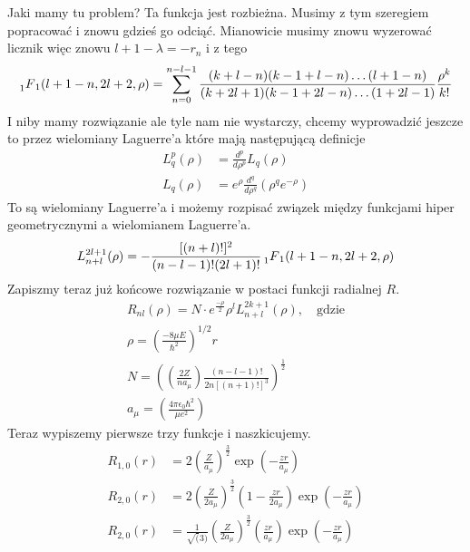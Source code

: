 Jaki mamy tu problem? Ta funkcja jest rozbieżna. Musimy z tym szeregiem popracować i znowu gdzieś go odciąć. Mianowicie musimy znowu wyzerować licznik więc znowu $l + 1 - \lambda = -r_n$ i z tego
\begin{equation*}
	\prescript{}{1}{F}_{1}(l + 1 - n, 2l+2, \rho) = \sum_{n=0}^{n - l -1} \frac{(k+l - n)(k -1+l-n)\dots(l+1-n)}{(k+2l+1)(k-1+2l - n)\dots(1 + 2l - 1)} \frac{\rho^k}{k!}
\end{equation*}
I niby mamy rozwiązanie ale tyle nam nie wystarczy, chcemy wyprowadzić jeszcze to przez wielomiany Laguerre'a które mają następującą definicje
\begin{equation*}
	\begin{split}
		L_q^p(\rho)&= \frac{d^p}{d \rho^p}L_q(\rho) \\
		L_q(\rho) &= e^{\rho} \frac{d^q}{d \rho^q}\left(\rho^q e^{-\rho}\right)
	\end{split}
\end{equation*}
To są wielomiany Laguerre'a i możemy rozpisać związek między funkcjami hiper geometrycznymi a wielomianem Laguerre'a.
\begin{equation*}
	L_{n+l}^{2l+1}(\rho) = -\frac{[(n+l)!]^2}{(n-l-1)!(2l+1)!} \prescript{}{1}{F}_{1}(l + 1 - n, 2l+2, \rho) 
\end{equation*}
Zapiszmy teraz już końcowe rozwiązanie w postaci funkcji radialnej $R$.
\begin{equation*}
	\begin{gathered}
		R_{n l}(\rho)=N \cdot e^{\frac{-\rho}{2}} \rho^{l} L_{n+l}^{2 k+1}(\rho), \quad \text{gdzie} \\
		\rho=\left(\frac{-8\mu E}{\hbar^2}\right)^{1/2}r \\
		N = \left( \left( \frac{2Z}{n a_{\mu}} \right) \frac{(n - l - 1)!}{2n[(n+1)!]^3} \right)^{\frac{1}{2}} \\
		a_{\mu} = \left(\frac{4 \pi \epsilon_0 \hbar^2}{\mu e^2}\right)
	\end{gathered}
\end{equation*}
Teraz wypiszemy pierwsze trzy funkcje i naszkicujemy.
\begin{equation*}
	\begin{split}
		R_{1,0}(r) &=  2 \left(\frac{Z}{a_{\mu}}\right)^{\frac32} \exp(-\frac{zr}{a_{\mu}}) \\
		R_{2,0}(r) &=  2 \left(\frac{Z}{2a_{\mu}}\right)^{\frac32}\left(1 - \frac{zr}{2a_{\mu}}\right) \exp(-\frac{zr}{a_{\mu}}) \\
		R_{2,0}(r) &=  \frac{1}{\sqrt(3)} \left(\frac{Z}{2a_{\mu}}\right)^{\frac32} \left(\frac{zr}{a_{\mu}}\right) \exp(-\frac{zr}{a_{\mu}})
	\end{split}
\end{equation*}
